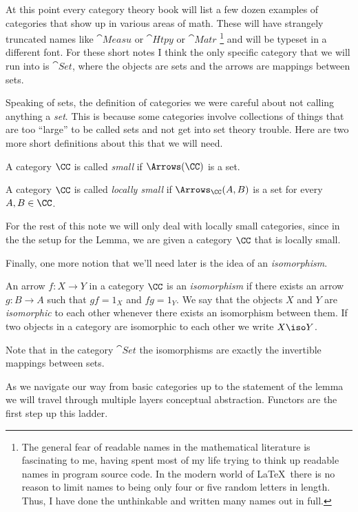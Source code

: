 At this point every category theory book will list a few dozen examples of categories that
show up in various areas of math. These will have strangely truncated names like
$\cat{Measu}$ or $\cat{Htpy}$ or $\cat{Matr}$%
\footnote{The general fear of readable names in the mathematical literature is fascinating
to me, having spent most of my life trying to think up readable names in program source
code. In the modern world of \LaTeX\ there is no reason to limit names to being only four
or five random letters in length. Thus, I have done the unthinkable and written many names
out in full.}%
and will be typeset in a different font. For these short notes I think the only specific
category that we will run into is $\cat{Set}$, where the objects are sets and the arrows
are mappings between sets.

Speaking of sets, the definition of categories we were careful about not calling anything
a {\it set}. This is because some categories involve collections of things that are too
``large'' to be called sets and not get into set theory trouble. Here are two more short
definitions about this that we will need.

\begin{defn}
A category $\CC$ is called {\it small} if $\Arrows(\CC)$ is a set.
\end{defn}

\begin{defn}
A category $\CC$ is called {\it locally small} if $\Arrows_{\CC}(A,B)$ is a set for every
$A, B \in \CC$. \end{defn}%
\noindent
For the rest of this note we will only deal with locally small categories, since in the
the setup for the Lemma, we are given a category $\CC$ that is locally small.

Finally, one more notion that we'll need later is the idea of an {\it isomorphism}.

\begin{defn}
An arrow $f: X \to Y$ in a category $\CC$ is an {\it isomorphism} if there exists an arrow
$g: B \to A$ such that $gf = 1_X$ and $fg = 1_Y$. We say that the objects $X$ and $Y$ are
{\it isomorphic} to each other whenever there exists an isomorphism between them. If two
objects in a category are isomorphic to each other we write $X \iso Y$.
\end{defn}
\noindent
Note that in the category $\cat{Set}$ the isomorphisms are exactly the invertible mappings
between sets.

\medskip
As we navigate our way from basic categories up to the statement of the lemma we will
travel through multiple layers conceptual abstraction. Functors are the first step up this
ladder.

